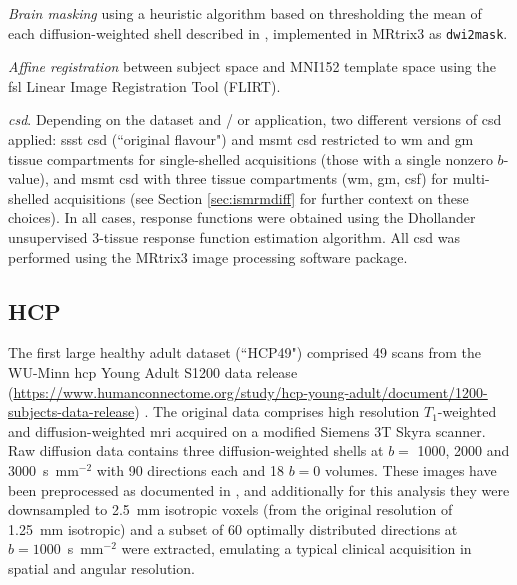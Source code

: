 \textit{Brain masking}\autocite{Tournier2019}
using a heuristic algorithm based on thresholding the mean of each diffusion-weighted shell described in \textcite{Dhollander2016}, implemented in MRtrix3\autocite{Tournier2019} as \verb|dwi2mask|.

\textit{Affine registration} between subject space and MNI152\autocite{Fonov2011} template space using the \gls{fsl} Linear Image Registration Tool (FLIRT)\autocite{Jenkinson2001,Jenkinson2002}.

\textit{\Gls{csd}}. Depending on the dataset and / or application, two different versions of \gls{csd} applied: \gls{ssst} \gls{csd}\autocite{Tournier2007,Tournier2019} (``original flavour") and \gls{msmt} \gls{csd}\autocite{Jeurissen2014} restricted to \gls{wm} and \gls{gm} tissue compartments for single-shelled acquisitions (those with a single nonzero $b$-value),
and \gls{msmt} \gls{csd} with three tissue compartments (\gls{wm}, \gls{gm}, \gls{csf}) for multi-shelled acquisitions (see Section \ref{sec:ismrmdiff} for further context on these choices).
In all cases, response functions were obtained using the Dhollander unsupervised 3-tissue response function estimation algorithm\autocite{Dhollander2016,Dhollander2019}.
All \gls{csd} was performed using the MRtrix3 image processing software package\autocite{Tournier2019}.

\subsection{HCP}

The first large healthy adult dataset (``HCP49") comprised 49 scans from the WU-Minn \gls{hcp} Young Adult S1200 data release (\url{https://www.humanconnectome.org/study/hcp-young-adult/document/1200-subjects-data-release}) \autocite{VanEssen2013}.
The original data comprises high resolution $T_1$-weighted and diffusion-weighted \gls{mri} acquired on a modified Siemens 3T Skyra scanner.
Raw diffusion data contains three diffusion-weighted shells at $b=$ 1000, 2000 and 3000~s~mm$^{-2}$ with 90 directions each and 18 $b=0$ volumes\autocite{Sotiropoulos2013}.
These images have been preprocessed as documented in \textcite{Glasser2013,Sotiropoulos2013},
and additionally for this analysis they were downsampled to 2.5~mm isotropic voxels (from the original resolution of 1.25~mm isotropic) and a subset of 60 optimally distributed directions at $b=1000$~s~mm$^{-2}$ were extracted, emulating a typical clinical acquisition in spatial and angular resolution.

